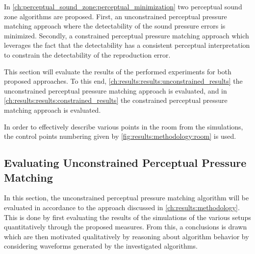 In \autoref{ch:perceptual_sound_zone:perceptual_minimization} two perceptual sound zone algorithms are proposed. 
First, an unconstrained perceptual pressure matching approach where the detectability of the sound pressure 
errors is minimized.
Secondly, a constrained perceptual pressure matching approach which leverages the fact that the 
detectability has a consistent 
perceptual interpretation to constrain the detectability of the reproduction error.

This section will evaluate the results of the performed experiments for both proposed approaches.
To this end, \autoref{ch:results:results:unconstrained_results} the unconstrained perceptual pressure 
matching approach is evaluated, and in  \autoref{ch:results:results:constrained_results} the constrained perceptual pressure 
matching approach is evaluated.

In order to effectively describe various points in the room from the simulations, the 
control points numbering given by \autoref{fig:results:methodology:room} is used.

\subsection{Evaluating Unconstrained Perceptual Pressure Matching}
\label{ch:results:results:unconstrained_results}
In this section, the unconstrained perceptual pressure matching algorithm will be evaluated in accordance to the 
approach discussed in \autoref{ch:results:methodology}.
This is done by first evaluating the results of the simulations of the various setups 
quantitatively through the proposed measures.
From this, a conclusions is drawn which are then motivated qualitatively by reasoning about algorithm behavior
by considering waveforms generated by the investigated algorithms.

